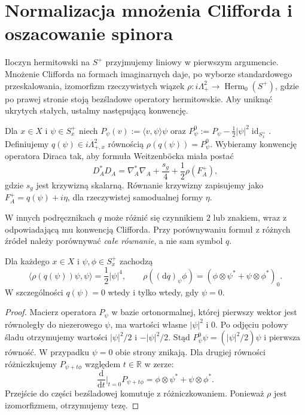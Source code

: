 \section{Normalizacja mnożenia Clifforda i oszacowanie spinora}
\label{sec:tg-sw12-clifford}

Iloczyn hermitowski na $S^+$ przyjmujemy liniowy w pierwszym
argumencie. Mnożenie Clifforda na formach imaginarnych daje, po
wyborze standardowego przeskalowania, izomorfizm rzeczywistych
wiązek $\rho\colon i\Lambda^2_+\longrightarrow
\operatorname{Herm}_0(S^+)$, gdzie po prawej stronie stoją
bezśladowe operatory hermitowskie. Aby uniknąć ukrytych stałych,
ustalmy następującą konwencję.

\begin{definicja}
\label{def:tg-sw12-q}
Dla $x\in X$ i $\psi\in S_x^+$ niech
$P_\psi(v):=\langle v,\psi\rangle\psi$ oraz
$P_\psi^0:=P_\psi-\tfrac12|\psi|^2\operatorname{id}_{S_x^+}$.
Definiujemy $q(\psi)\in i\Lambda^2_{+,x}$ równością
$\rho(q(\psi))=P_\psi^0$.
Wybieramy konwencję operatora Diraca tak, aby formuła
Weitzenböcka miała postać
\[
D_A^*D_A=\nabla_A^*\nabla_A+\frac{s_g}{4}
 +\frac12\rho(F_A^+),
\]
gdzie $s_g$ jest krzywizną skalarną. Równanie krzywizny
zapisujemy jako $F_A^+=q(\psi)+i\eta$, dla rzeczywistej
samodualnej formy $\eta$.
\end{definicja}

W innych podręcznikach $q$ może różnić się czynnikiem $2$
lub znakiem, wraz z odpowiadającą mu konwencją Clifforda.
Przy porównywaniu formuł z różnych źródeł należy porównywać
\emph{całe równanie}, a nie sam symbol $q$.

\begin{lemat}
\label{lem:tg-sw12-q}
Dla każdego $x\in X$ i $\psi,\phi\in S_x^+$ zachodzą
\[
\langle\rho(q(\psi))\psi,\psi\rangle=\frac12|\psi|^4,
\qquad
\rho((\mathrm dq)_\psi\phi)
=(\phi\otimes\psi^*+\psi\otimes\phi^*)_0.
\]
W szczególności $q(\psi)=0$ wtedy i tylko wtedy, gdy $\psi=0$.
\end{lemat}

\begin{proof}
Macierz operatora $P_\psi$ w bazie ortonormalnej, której
pierwszy wektor jest równoległy do niezerowego $\psi$,
ma wartości własne $|\psi|^2$ i $0$. Po odjęciu połowy
śladu otrzymujemy wartości $|\psi|^2/2$ i $-|\psi|^2/2$.
Stąd $P_\psi^0\psi=(|\psi|^2/2)\psi$ i pierwsza
równość. W przypadku $\psi=0$ obie strony znikają.
Dla drugiej równości różniczkujemy
$P_{\psi+t\phi}$ względem $t\in\mathbb R$ w zerze:
\[
\frac{\mathrm d}{\mathrm dt}\bigg|_{t=0}P_{\psi+t\phi}
=\phi\otimes\psi^*+\psi\otimes\phi^*.
\]
Przejście do części bezśladowej komutuje z różniczkowaniem.
Ponieważ $\rho$ jest izomorfizmem, otrzymujemy tezę.
\end{proof}

